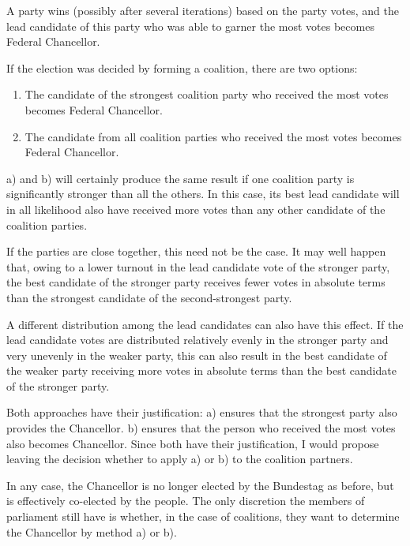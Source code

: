 A party wins
(possibly after several iterations) based on the party votes, and the lead candidate
of this party who was able to garner the most votes becomes Federal Chancellor.

If the election was decided by forming a coalition, there are two options:
\begin{enumerate}[label=\alph*)]
  \item The candidate of the strongest coalition party who received the most votes becomes Federal Chancellor.
  \item The candidate from all coalition parties who received the most votes becomes Federal Chancellor.
\end{enumerate}

a) and b) will certainly produce the same result if one coalition party is significantly stronger than all the others.
In this case, its best lead candidate will in all likelihood also have received more votes than any other
candidate of the coalition parties.

If the parties are close together, this need not be the case.
It may well happen that, owing to a lower turnout in the lead candidate vote of the stronger party,
the best candidate of the stronger party receives fewer votes in absolute terms than the strongest candidate of the second-strongest
party.

A different distribution among the lead candidates can also have this effect. If the lead candidate votes
are distributed relatively evenly in the stronger party and very unevenly in the weaker party, this can also
result in the best candidate of the weaker party receiving more votes in absolute terms than the best candidate of the
stronger party.

Both approaches have their justification: a) ensures that the strongest party also provides the Chancellor.
b) ensures that the person who received the most votes also becomes Chancellor.
Since both have their
justification, I would propose leaving the decision whether to apply a) or b) to the coalition partners.

In any case, the Chancellor is no longer elected by the Bundestag as before, but is effectively co-elected by the people.
The
only discretion the members of parliament still have is whether, in the case of coalitions, they want to determine the Chancellor by
method a) or b).


